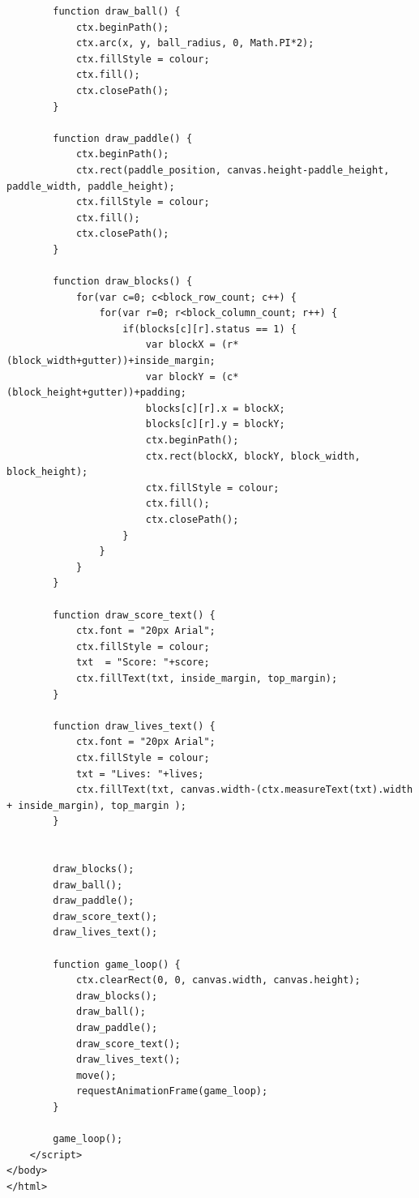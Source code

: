\documentclass[10pt, a4paper, oneside]{article}
\begin{document}
\begin{lstlisting}
        function draw_ball() {
            ctx.beginPath();
            ctx.arc(x, y, ball_radius, 0, Math.PI*2);
            ctx.fillStyle = colour;
            ctx.fill();
            ctx.closePath();
        }

        function draw_paddle() {
            ctx.beginPath();
            ctx.rect(paddle_position, canvas.height-paddle_height, paddle_width, paddle_height);
            ctx.fillStyle = colour;
            ctx.fill();
            ctx.closePath();
        }

        function draw_blocks() {
            for(var c=0; c<block_row_count; c++) {
                for(var r=0; r<block_column_count; r++) {
                    if(blocks[c][r].status == 1) {
                        var blockX = (r*(block_width+gutter))+inside_margin;
                        var blockY = (c*(block_height+gutter))+padding;
                        blocks[c][r].x = blockX;
                        blocks[c][r].y = blockY;
                        ctx.beginPath();
                        ctx.rect(blockX, blockY, block_width, block_height);
                        ctx.fillStyle = colour;
                        ctx.fill();
                        ctx.closePath();
                    }
                }
            }
        }

        function draw_score_text() {
            ctx.font = "20px Arial";
            ctx.fillStyle = colour;
            txt  = "Score: "+score;
            ctx.fillText(txt, inside_margin, top_margin);
        }

        function draw_lives_text() {
            ctx.font = "20px Arial";
            ctx.fillStyle = colour;
            txt = "Lives: "+lives;
            ctx.fillText(txt, canvas.width-(ctx.measureText(txt).width + inside_margin), top_margin );
        }

        
        draw_blocks();
        draw_ball();
        draw_paddle();
        draw_score_text();
        draw_lives_text();

        function game_loop() {
            ctx.clearRect(0, 0, canvas.width, canvas.height);
            draw_blocks();
            draw_ball();
            draw_paddle();
            draw_score_text();
            draw_lives_text();
            move();
            requestAnimationFrame(game_loop);
        }
        
        game_loop();
    </script>
</body>
</html>
\end{lstlisting}

\paragraph{} 
\end{document}
